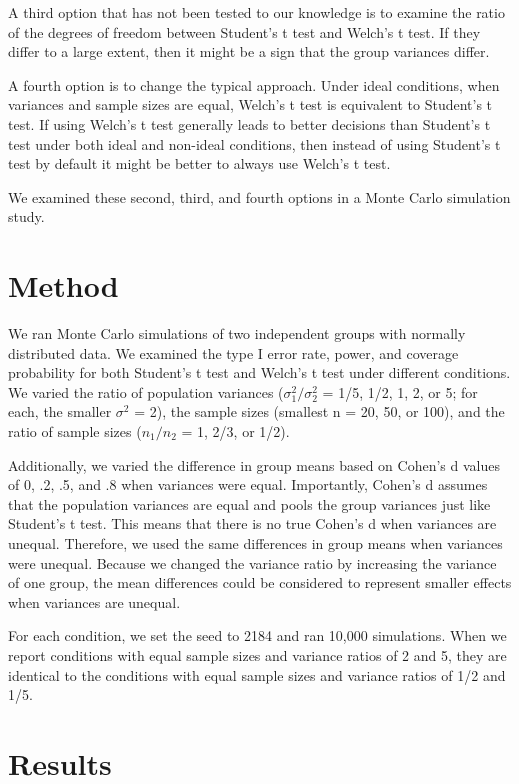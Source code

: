 \documentclass[man,a4paper,noextraspace,apacite]{apa6}
\begin{document}
    A third option that has not been tested to our knowledge is to examine the ratio of the degrees of freedom between Student's t test and Welch's t test. If they differ to a large extent, then it might be a sign that the group variances differ.

    A fourth option is to change the typical approach. Under ideal conditions, when variances and sample sizes are equal, Welch's t test is equivalent to Student's t test. If using Welch's t test generally leads to better decisions than Student's t test under both ideal and non-ideal conditions, then instead of using Student's t test by default it might be better to always use Welch's t test.
    
    We examined these second, third, and fourth options in a Monte Carlo simulation study. 
    
\section{Method}

    We ran Monte Carlo simulations of two independent groups with normally distributed data. We examined the type I error rate, power, and coverage probability for both Student's t test and Welch's t test under different conditions. We varied the ratio of population variances ($\sigma_{1}^2/\sigma_{2}^2$ = 1/5, 1/2, 1, 2, or 5; for each, the smaller $\sigma^2$ = 2), the sample sizes (smallest n = 20, 50, or 100), and the ratio of sample sizes ($n_{1}/n_{2}$ = 1, 2/3, or 1/2). 
    
    Additionally, we varied the difference in group means based on Cohen's d values of 0, .2, .5, and .8 when variances were equal. Importantly, Cohen's d assumes that the population variances are equal and pools the group variances just like Student's t test. This means that there is no true Cohen's d when variances are unequal. Therefore, we used the same differences in group means when variances were unequal. Because we changed the variance ratio by increasing the variance of one group, the mean differences could be considered to represent smaller effects when variances are unequal.
    
    For each condition, we set the seed to 2184 and ran 10,000 simulations. When we report conditions with equal sample sizes and variance ratios of 2 and 5, they are identical to the conditions with equal sample sizes and variance ratios of 1/2 and 1/5. 

\section{Results}   
\end{document}
